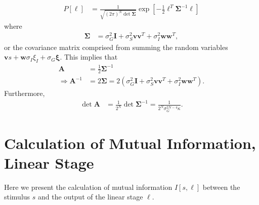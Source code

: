 \documentclass[11pt]{article}
\begin{document}
	\begin{align}
		P[\boldsymbol{\ell}] &= \frac{1}{\sqrt{(2\pi)^N \det\boldsymbol{\Sigma}}} \exp\left[-\frac{1}{2} \boldsymbol{\ell}^T \boldsymbol{\Sigma}^{-1} \boldsymbol{\ell}\right]
	\end{align}
	where 
	\begin{align}
		\boldsymbol{\Sigma}&= \sigma_G^2 \mathbf{I} + \sigma_S^2 \mathbf{vv}^T + \sigma_I^2 \mathbf{ww}^T,
	\end{align}
	or the covariance matrix comprised from summing the random variables $\mathbf{v}s+\mathbf{w}\sigma_I\xi_I + \sigma_G\boldsymbol{\xi}$. This implies that 
	\begin{align}
		\mathbf{A} &= \frac{1}{2} \boldsymbol{\Sigma}^{-1} \\
		\Rightarrow \mathbf{A}^{-1} &= 2 \boldsymbol{\Sigma} = 2\left(\sigma_G^2 \mathbf{I} + \sigma_S^2 \mathbf{vv}^T + \sigma_I^2 \mathbf{ww}^T\right).
	\end{align}
	Furthermore, 
	\begin{align}
		\det \mathbf{\mathbf{A}} &= \frac{1}{2^N} \det \boldsymbol{\Sigma}^{-1} = \frac{1}{2^N \sigma_G^{2N-4} \kappa}.
	\end{align}
	\newpage
	
	\section{Calculation of Mutual Information, Linear Stage}
	\label{mutual-linear}
	Here we present the calculation of mutual information $I[s, \boldsymbol{\ell}]$ between the stimulus $s$ and the output of the linear stage $\boldsymbol{\ell}$.
	
\end{document}
